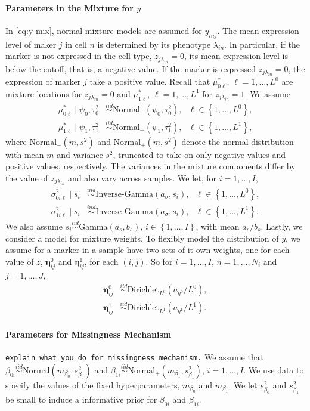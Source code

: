 \documentclass[12pt,]{article}
\newcommand{\bc}[1]{ \left\{#1\right\} }
\newcommand{\N}{ \mathcal{N} }
\newcommand{\iid}{\overset{iid}{\sim}}
\newcommand{\ind}{\overset{ind}{\sim}}
\def\N{\text{Normal}}
\def\G{\text{Gamma}}
\def\IG{\text{Inverse-Gamma}}
\def\Dir{\text{Dirichlet}}
\def\mus{\mu^*}
\begin{document}
\paragraph*{Parameters in the Mixture for $y$}
In \eqref{eq:y-mix}, normal mixture models are assumed for $y_{inj}$. The mean
expression level of maker $j$ in cell $n$ is determined by its phenotype
$\lambda_{in}$.  In particular, if the marker is not expressed in the cell
type, $z_{j \lambda_{in}}=0$, its mean expression level is below the cutoff,
that is, a negative value.  If the marker is expressed $z_{j \lambda_{in}}=0$,
the expression of marker $j$ take a positive value.   Recall that
$\mus_{0\ell}$, $\ell=1, \ldots, L^0$ are mixture locations for $z_{j
\lambda_{in}}=0$ and $\mus_{1\ell}$, $\ell=1, \ldots, L^1$ for $z_{j
\lambda_{in}}=1$.  We assume 
\begin{align*}
\mus_{0\ell} \mid \psi_0, \tau^2_0 &\iid \N_-(\psi_0, \tau^2_0), ~~~ \ell \in \bc{1,...,L^0}, \\
\mus_{1\ell} \mid \psi_1, \tau^2_1 &\iid \N_+(\psi_1, \tau^2_1), ~~~ \ell \in \bc{1,...,L^1}, 
\end{align*}
where \(\N_-(m,s^2)\) and \(\N_+(m,s^2)\) denote the normal distribution with
mean \(m\) and variance \(s^2\), truncated to take on only negative values and
positive values, respectively.  The variances in the mixture components differ
by the value of $z_{j \lambda_{in}}$ and also vary across samples. We let, for
\(i=1, \ldots, I\),
\begin{align*}
\sigma^2_{0i\ell} \mid s_i &\ind \IG(a_\sigma, s_i), ~~~ \ell \in \bc{1,...,L^0}, \\
\sigma^2_{1i\ell} \mid s_i &\ind \IG(a_\sigma, s_i), ~~~ \ell \in \bc{1,...,L^1}.  
\end{align*}
We also assume $s_i \iid \G(a_s, b_s)$, $i \in \bc{1,...,I}$, with mean
\(a_s/b_s\). Lastly, we consider a model for mixture weights. To flexibly model
the distribution of $y$, we assume for a marker in a sample have two sets of it
own weights, one for each value of $z$, $\bm\eta^0_{ij}$ and $\bm\eta^1_{ij}$,
for each $(i, j)$. So for \(i=1, \ldots, I\), \(n=1, \ldots, N_i\) and \(j=1,
\ldots, J\),
\begin{align*}
\bm\eta^0_{ij} &\iid \Dir_{L^0}(a_{\eta^0}/L^0), \\
\bm\eta^1_{ij} &\iid \Dir_{L^1}(a_{\eta^1}/L^1). 
\end{align*}


\paragraph*{Parameters for Missingness Mechanism}
{\tt explain what you do for missingness mechanism.}
%
We assume that $\beta_{0i} \iid \N(m_{\beta_0}, s^2_{\beta_0})$ and $\beta_{1i}
\iid \N_+(m_{\beta_1}, s^2_{\beta_1})$, $i=1, \ldots, I$.  We use data to
specify the values of the fixed hyperparameters, $m_{\beta_0}$ and
$m_{\beta_1}$.  We let $s^2_{\beta_0}$ and $s^2_{\beta_1}$ be small to induce a
informative prior for $\beta_{0i}$ and $\beta_{1i}$.
\end{document}
